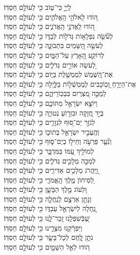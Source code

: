 \documentclass[twoside, openany, parskip=half, 11pt]{book}
\begin{document}
 
לַֽיְיָ֣ כִּי־ט֑וֹב \hfill כִּ֖י לְעוֹלָ֣ם חַסְדּֽוֹ׃ \\
ה֭וֹדוּ לֵֽאלֹהֵ֣י הָֽאֱלֹהִ֑ים \hfill כִּ֖י לְעוֹלָ֣ם חַסְדּֽוֹ׃\\
ה֭וֹדוּ לַֽאֲדֹנֵ֣י הָֽאֲדֹנִ֑ים \hfill כִּ֖י לְעוֹלָ֣ם חַסְדּֽוֹ׃\\
לְעֹ֘שֵׂ֤ה נִפְלָא֣וֹת גְּדֹל֣וֹת לְבַדּ֑וֹ \hfill כִּ֖י לְעוֹלָ֣ם חַסְדּֽוֹ׃\\
לְעֹשֵׂ֣ה הַ֭שָּׁמַיִם בִּתְבוּנָ֑ה \hfill כִּ֖י לְעוֹלָ֣ם חַסְדּֽוֹ׃\\
לְרוֹקַ֣ע הָ֭אָרֶץ עַל־הַמָּ֑יִם \hfill כִּ֖י לְעוֹלָ֣ם חַסְדּֽוֹ׃\\
לְ֭עֹשֵׂה אוֹרִ֣ים גְּדֹלִ֑ים \hfill כִּ֖י לְעוֹלָ֣ם חַסְדּֽוֹ׃\\
אֶת־הַ֭שֶּׁמֶשׁ לְמֶמְשֶׁ֣לֶת בַּיּ֑וֹם \hfill כִּ֖י לְעוֹלָ֣ם חַסְדּֽוֹ׃\\
אֶת־הַיָּרֵ֣חַ וְ֭כֽוֹכָבִים לְמֶמְשְֿׁל֣וֹת בַּלָּ֑יְלָה \hfill כִּ֖י לְעוֹלָ֣ם חַסְדּֽוֹ׃\\
לְמַכֵּ֣ה מִ֭צְרַיִם בִּבְכֽוֹרֵיהֶ֑ם \hfill כִּ֖י לְעוֹלָ֣ם חַסְדּֽוֹ׃\\
וַיּוֹצֵ֣א יִשְׂרָאֵ֣ל מִתּוֹכָ֑ם \hfill כִּ֖י לְעוֹלָ֣ם חַסְדּֽוֹ׃\\
בְּיָ֣ד חֲ֭זָקָה וּבִזְר֣וֹעַ נְטוּיָ֑ה \hfill כִּ֖י לְעוֹלָ֣ם חַסְדּֽוֹ׃\\
לְגֹזֵ֣ר יַם־ס֭וּף לִגְזָרִ֑ים \hfill כִּ֖י לְעוֹלָ֣ם חַסְדּֽוֹ׃\\
וְהֶֽעֲבִ֣יר יִשְׂרָאֵ֣ל בְּתוֹכ֑וֹ \hfill כִּ֖י לְעוֹלָ֣ם חַסְדּֽוֹ׃\\
וְנִ֘עֵ֤ר פַּרְעֹ֣ה וְחֵיל֣וֹ בְיַם־ס֑וּף \hfill כִּ֖י לְעוֹלָ֣ם חַסְדּֽוֹ׃\\
לְמוֹלִ֣יךְ עַ֭מּוֹ בַּמִּדְבָּ֑ר \hfill כִּ֖י לְעוֹלָ֣ם חַסְדּֽוֹ׃\\
לְמַכֵּ֣ה מְלָכִ֣ים גְּדֹלִ֑ים 	\hfill כִּ֖י לְעוֹלָ֣ם חַסְדּֽוֹ׃\\
וַֽ֭יַּֽהֲרֹג מְלָכִ֣ים אַדִּירִ֑ים \hfill כִּ֖י לְעוֹלָ֣ם חַסְדּֽוֹ׃\\
לְ֭סִיחוֹן מֶ֥לֶךְ הָֽאֱמֹרִ֑י \hfill כִּ֖י לְעוֹלָ֣ם חַסְדּֽוֹ׃\\
וּ֭לְעוֹג מֶ֣לֶךְ הַבָּשָׁ֑ן \hfill כִּ֖י לְעוֹלָ֣ם חַסְדּֽוֹ׃\\
וְנָתַ֣ן אַרְצָ֣ם לְנַֽחֲלָ֑ה \hfill כִּ֖י לְעוֹלָ֣ם חַסְדּֽוֹ׃\\
נַֽ֭חֲלָה לְיִשְׂרָאֵ֣ל עַבְדּ֑וֹ \hfill כִּ֖י לְעוֹלָ֣ם חַסְדּֽוֹ׃\\
שֶׁ֭בְּֿשִׁפְלֵ֥נוּ זָֽכַר־לָ֑נוּ \hfill כִּ֖י לְעוֹלָ֣ם חַסְדּֽוֹ׃\\
וַיִּפְרְֿקֵ֥נוּ מִצָּרֵ֑ינוּ \hfill כִּ֖י לְעוֹלָ֣ם חַסְדּֽוֹ׃\\
נֹתֵ֣ן לֶֽ֭חֶם לְכָל־בָּשָׂ֑ר \hfill כִּ֖י לְעוֹלָ֣ם חַסְדּֽוֹ׃\\
ה֭וֹדוּ לְאֵ֣ל הַשָּׁמָ֑יִם \hfill כִּ֖י לְעוֹלָ֣ם חַסְדּֽוֹ׃
	
\end{document}
